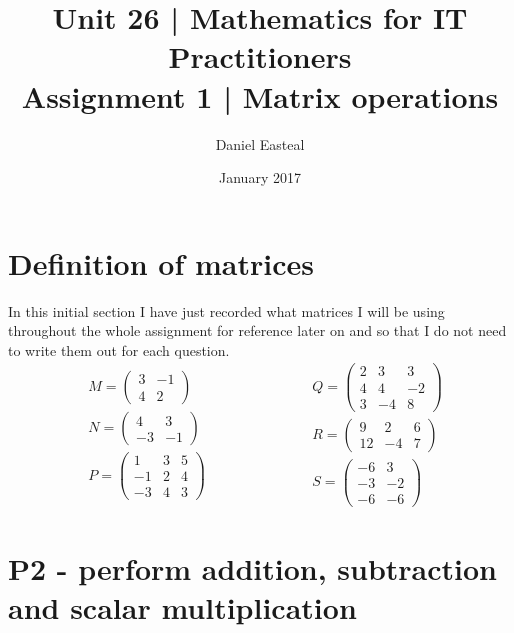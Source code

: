 \documentclass{article}
\begin{document}
\title{Unit 26 | Mathematics for IT Practitioners \\ \vspace{1.5cm} Assignment 1 | Matrix operations}
\author{Daniel Easteal}
\date{January 2017}
\maketitle
\newpage
\tableofcontents
\newpage
\section{Definition of matrices}
In this initial section I have just recorded what matrices I will be using throughout the whole assignment for reference later on and so that I do not need to write them out for each question.
\begin{equation*}
	\begin{split}
	&M =
	\begin{pmatrix}
		3 & -1\\
		4 & 2
	\end{pmatrix}
	\\
	&N =
	\begin{pmatrix}
		4 & 3\\
		-3 & -1
	\end{pmatrix}
	\\
	&P =
	\begin{pmatrix}
		1 & 3 & 5\\
		-1 & 2 & 4\\
		-3 & 4 & 3
	\end{pmatrix}
\end{split}
\qquad
\qquad
\qquad
\begin{split}
	&Q =
	\begin{pmatrix}
		2 & 3 & 3\\
		4 & 4 & -2\\
		3 & -4 & 8
	\end{pmatrix}
	\\
	&R = 
	\begin{pmatrix}
		9 & 2 & 6\\
		12 & -4 & 7
	\end{pmatrix}
	\\
	&S =
	\begin{pmatrix}
		-6 & 3\\
		-3 & -2\\
		-6 & -6
	\end{pmatrix}
\end{split}
\end{equation*}
\section{P2 - perform addition, subtraction and scalar multiplication}
\end{document}
